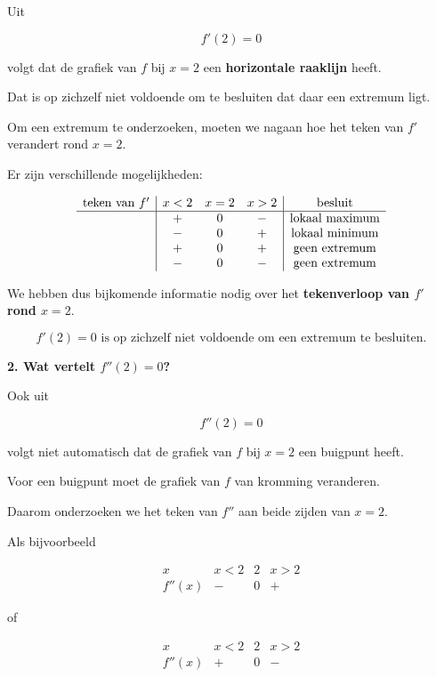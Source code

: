 \documentclass{ximera}
\begin{document}
\begin{oefening}{\oefG}
\begin{oplossing}
    Uit
    
    \[
    f'(2)=0
    \]
    
    volgt dat de grafiek van $f$ bij $x=2$ een
    \textbf{horizontale raaklijn} heeft.
    
    Dat is op zichzelf niet voldoende om te besluiten dat daar een
    extremum ligt.
    
    Om een extremum te onderzoeken, moeten we nagaan hoe het teken van
    $f'$ verandert rond $x=2$.
    
    Er zijn verschillende mogelijkheden:
    
    \[
    \begin{array}{c|ccc|c}
    \text{teken van }f'
    & x<2 & x=2 & x>2 & \text{besluit}\\ \hline
    & + & 0 & - & \text{lokaal maximum}\\
    & - & 0 & + & \text{lokaal minimum}\\
    & + & 0 & + & \text{geen extremum}\\
    & - & 0 & - & \text{geen extremum}
    \end{array}
    \]
    
    We hebben dus bijkomende informatie nodig over het
    \textbf{tekenverloop van $f'$ rond $x=2$}.
    
    \[
    \boxed{
    f'(2)=0
    \text{ is op zichzelf niet voldoende om een extremum te besluiten.}
    }
    \]
    
    \textbf{2. Wat vertelt $f''(2)=0$?}
    
    Ook uit
    
    \[
    f''(2)=0
    \]
    
    volgt niet automatisch dat de grafiek van $f$ bij $x=2$
    een buigpunt heeft.
    
    Voor een buigpunt moet de grafiek van $f$ van kromming veranderen.
    
    Daarom onderzoeken we het teken van $f''$ aan beide zijden van
    $x=2$.
    
    Als bijvoorbeeld
    
    \[
    \begin{array}{c|ccc}
    x & x<2 & 2 & x>2\\ \hline
    f''(x) & - & 0 & +
    \end{array}
    \]
    
    of
    
    \[
    \begin{array}{c|ccc}
    x & x<2 & 2 & x>2\\ \hline
    f''(x) & + & 0 & -
    \end{array}
    \]
    

\end{oplossing}
\end{oefening}
\end{document}
